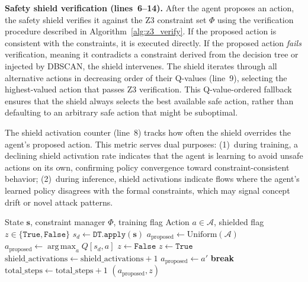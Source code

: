 \documentclass[12pt, letterpaper, oneside]{report}
\newcommand{\argmax}{\operatorname*{arg\,max}}
\newcommand{\bs}{\mathbf{s}}
\begin{document}
\textbf{Safety shield verification (lines~6--14).} After the agent proposes an action, the safety shield verifies it against the Z3 constraint set $\Phi$ using the verification procedure described in Algorithm~\ref{alg:z3_verify}. If the proposed action is consistent with the constraints, it is executed directly. If the proposed action \emph{fails} verification, meaning it contradicts a constraint derived from the decision tree or injected by DBSCAN, the shield intervenes. The shield iterates through all alternative actions in decreasing order of their Q-values (line~9), selecting the highest-valued action that passes Z3 verification. This Q-value-ordered fallback ensures that the shield always selects the best available safe action, rather than defaulting to an arbitrary safe action that might be suboptimal.

The shield activation counter (line~8) tracks how often the shield overrides the agent's proposed action. This metric serves dual purposes: (1)~during training, a declining shield activation rate indicates that the agent is learning to avoid unsafe actions on its own, confirming policy convergence toward constraint-consistent behavior; (2)~during inference, shield activations indicate flows where the agent's learned policy disagrees with the formal constraints, which may signal concept drift or novel attack patterns.

\begin{algorithm}[htbp]
\caption{SymbolicShieldAgent Action Selection}
\label{alg:agent_act}
\begin{algorithmic}[1]
\Require State $\bs$, constraint manager $\Phi$, training flag
\Ensure Action $a \in \mathcal{A}$, shielded flag $z \in \{\texttt{True}, \texttt{False}\}$
\State $s_d \leftarrow \texttt{DT.apply}(\bs)$ 
    \State $a_{\text{proposed}} \leftarrow \text{Uniform}(\mathcal{A})$ 
\Else
    \State $a_{\text{proposed}} \leftarrow \argmax_{a} Q[s_d, a]$ 
\EndIf
\State $z \leftarrow \texttt{False}$
\If{$\neg \texttt{verify}(\Phi, \bs, a_{\text{proposed}})$} 
    \State $z \leftarrow \texttt{True}$
    \State $\text{shield\_activations} \leftarrow \text{shield\_activations} + 1$
        \If{$\texttt{verify}(\Phi, \bs, a')$}
            \State $a_{\text{proposed}} \leftarrow a'$
            \State \textbf{break}
        \EndIf
    \EndFor
\EndIf
\State $\text{total\_steps} \leftarrow \text{total\_steps} + 1$
\State \Return $(a_{\text{proposed}}, z)$
\end{algorithmic}
\end{algorithm}
\end{document}
